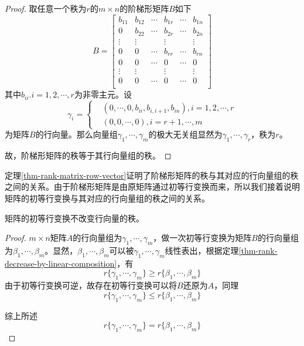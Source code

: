 \begin{proof}
    取任意一个秩为$r$的$m\times n$的阶梯形矩阵$B$如下
    \[
        B=\begin{bmatrix}
            b_{11} & b_{12} & \cdots & b_{1r} & \cdots & b_{1n} \\
            0      & b_{22} & \cdots & b_{2r} & \cdots & b_{2n} \\
            \vdots & \vdots &        & \vdots &        & \vdots \\
            0      & 0      & \cdots & b_{rr} & \cdots & b_{rn} \\
            0      & 0      & \cdots & 0      & \cdots & 0      \\
            \vdots & \vdots &        & \vdots &        & \vdots \\
            0      & 0      & \cdots & 0      & \cdots & 0      \\
        \end{bmatrix}
    \]
    其中$b_{ii}.i=1,2,\cdots,r$为非零主元。设
    \[
        \gamma_i=\left\{
        \begin{aligned}
            &(0,\cdots,0,b_{ii},b_{i,i+1},b_{in}),i=1,2,\cdots,r\\
            &(0,0,\cdots,0),i=r+1,\cdots,m
        \end{aligned}
        \right.
    \]
    为矩阵$B$的行向量。那么向量组$\gamma_1,\cdots,\gamma_m$的极大无关组显然为$\gamma_1,\cdots,\gamma_r$，秩为$r$。

    故，阶梯形矩阵的秩等于其行向量组的秩。
\end{proof}

定理\ref{thm-rank-matrix-row-vector}证明了阶梯形矩阵的秩与其对应的行向量组的秩之间的关系。由于阶梯形矩阵是由原矩阵通过初等行变换而来，所以我们接着说明矩阵的初等行变换与其对应的行向量组的秩之间的关系。

\begin{thm}
    \label{thm-rank-elem-row-trans-to-vec-grp}
    矩阵的初等行变换不改变行向量的秩。
\end{thm}

\begin{proof}
    $m\times n$矩阵$A$的行向量组为$\gamma_1,\cdots,\gamma_m$，做一次初等行变换为矩阵$B$的行向量组为$\beta_1,\cdots,\beta_m$。显然，$\beta_1,\cdots,\beta_m$可以被$\gamma_1,\cdots,\gamma_m$线性表出，根据定理\ref{thm-rank-decrease-by-linear-composition}，有
    \[
        r\{\gamma_1,\cdots,\gamma_m\}\geqslant r\{\beta_1,\cdots,\beta_m\}
    \]
    由于初等行变换可逆，故存在初等行变换可以将$B$还原为$A$，同理
    \[
        r\{\gamma_1,\cdots,\gamma_m\}\leqslant r\{\beta_1,\cdots,\beta_m\}
    \]

    综上所述
    \[
        r\{\gamma_1,\cdots,\gamma_m\}=r\{\beta_1,\cdots,\beta_m\}
    \]
\end{proof}


